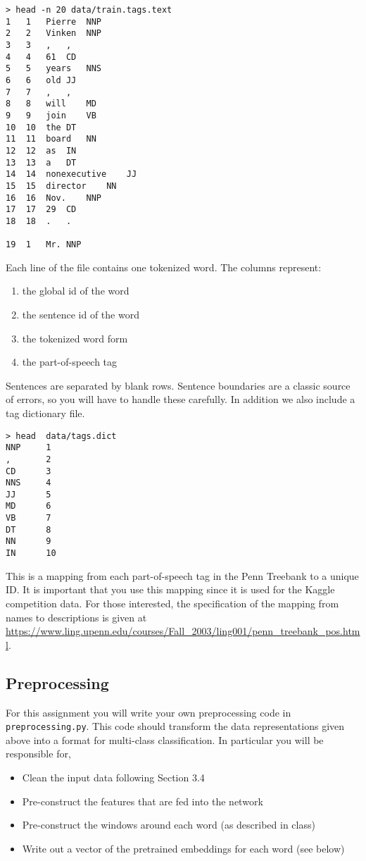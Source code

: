 \documentclass[11pt]{article}
\begin{document}
\begin{verbatim}
> head -n 20 data/train.tags.text
1	1	Pierre	NNP
2	2	Vinken	NNP
3	3	,	,
4	4	61	CD
5	5	years	NNS
6	6	old	JJ
7	7	,	,
8	8	will	MD
9	9	join	VB
10	10	the	DT
11	11	board	NN
12	12	as	IN
13	13	a	DT
14	14	nonexecutive	JJ
15	15	director	NN
16	16	Nov.	NNP
17	17	29	CD
18	18	.	.

19	1	Mr.	NNP
\end{verbatim}

\vspace{0.5cm}

Each line of the file contains one tokenized word. The columns represent:

\begin{enumerate}
\item the global id of the word
\item the sentence id of the word
\item the tokenized word form
\item the part-of-speech tag
\end{enumerate}

\noindent Sentences are separated by blank rows. Sentence boundaries are a
classic source of errors, so you will have to handle these carefully. In addition we also include a tag dictionary file. 

\begin{verbatim}
> head  data/tags.dict 
NNP     1
,       2
CD      3
NNS     4
JJ      5
MD      6
VB      7
DT      8
NN      9
IN      10
\end{verbatim}

This is a mapping from each part-of-speech tag in the Penn Treebank to
a unique ID. It is important that you use this mapping since it 
is used for the Kaggle competition data. For those interested, the
specification of the mapping from names to descriptions is given at
\url{https://www.ling.upenn.edu/courses/Fall_2003/ling001/penn_treebank_pos.html}.


\subsection{Preprocessing}

For this assignment you will write your own preprocessing code
in \texttt{preprocessing.py}. This code should transform the
data representations given above into a format for multi-class
classification. In particular you will be responsible for,

\begin{itemize}
\item Clean the input data following Section 3.4
\item Pre-construct the features that are fed into the network
\item Pre-construct the windows around each word (as described in class)
\item Write out a vector of the pretrained embeddings for each word (see below)
\end{itemize}
\end{document}
